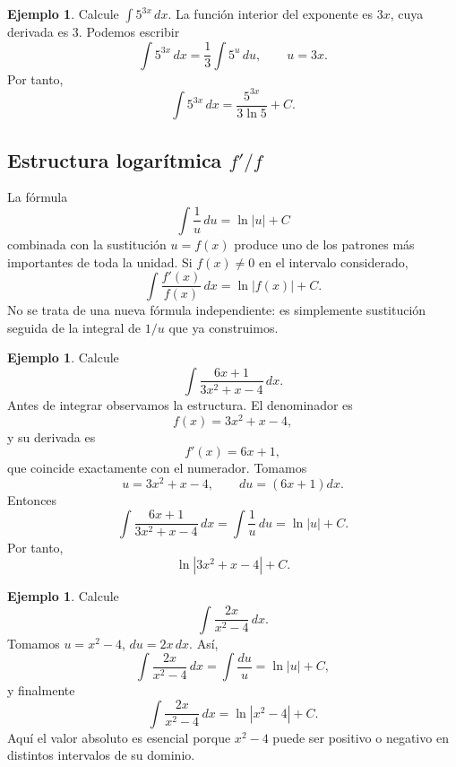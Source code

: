 \documentclass[12pt]{article}
\theoremstyle{definition}\newtheorem{definicion}[teorema]{Definición}\newtheorem{ejemplo}[teorema]{Ejemplo}\newtheorem{ejercicio}[teorema]{Ejercicio}
\theoremstyle{remark}\newtheorem*{observacion}{Observación}\newtheorem*{advertencia}{Advertencia}\newtheorem*{estrategia}{Estrategia}
\begin{document}
\begin{ejemplo}
Calcule $\int5^{3x}\,dx$.
La función interior del exponente es $3x$, cuya derivada es $3$. Podemos escribir
\[
\int5^{3x}\,dx=\frac13\int 5^u\,du,
\qquad u=3x.
\]
Por tanto,
\[
\boxed{\int5^{3x}\,dx=\frac{5^{3x}}{3\ln5}+C.}
\]
\end{ejemplo}

\subsection{Estructura logarítmica $f'/f$}
La fórmula
\[
\int\frac1u\,du=\ln|u|+C
\]
combinada con la sustitución $u=f(x)$ produce uno de los patrones más importantes de toda la unidad. Si $f(x)\neq0$ en el intervalo considerado,
\[
\boxed{\int\frac{f'(x)}{f(x)}\,dx=\ln|f(x)|+C.}
\]
No se trata de una nueva fórmula independiente: es simplemente sustitución seguida de la integral de $1/u$ que ya construimos.

\begin{ejemplo}
Calcule
\[
\int\frac{6x+1}{3x^2+x-4}\,dx.
\]
Antes de integrar observamos la estructura. El denominador es
\[
f(x)=3x^2+x-4,
\]
y su derivada es
\[
f'(x)=6x+1,
\]
que coincide exactamente con el numerador. Tomamos
\[
u=3x^2+x-4,\qquad du=(6x+1)dx.
\]
Entonces
\[
\int\frac{6x+1}{3x^2+x-4}\,dx
=\int\frac1u\,du
=\ln|u|+C.
\]
Por tanto,
\[
\boxed{\ln|3x^2+x-4|+C}.
\]
\end{ejemplo}

\begin{ejemplo}
Calcule
\[
\int\frac{2x}{x^2-4}\,dx.
\]
Tomamos $u=x^2-4$, $du=2x\,dx$. Así,
\[
\int\frac{2x}{x^2-4}\,dx=\int\frac{du}{u}=\ln|u|+C,
\]
y finalmente
\[
\boxed{\int\frac{2x}{x^2-4}\,dx=\ln|x^2-4|+C.}
\]
Aquí el valor absoluto es esencial porque $x^2-4$ puede ser positivo o negativo en distintos intervalos de su dominio.
\end{ejemplo}
\end{document}
